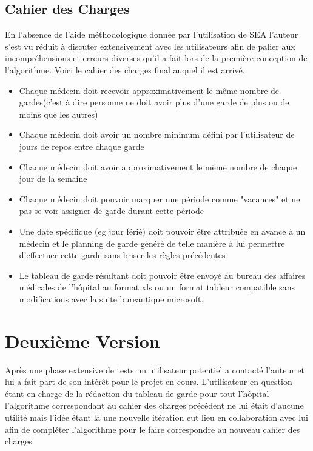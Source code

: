 \documentclass[11pt]{report}
\begin{document}
\subsection{Cahier des Charges}
En l'absence de l'aide méthodologique donnée par l'utilisation de SEA l'auteur s'est vu réduit à discuter extensivement avec les utilisateurs afin de palier aux incompréhensions et erreurs diverses qu'il a fait lors de la première conception de l'algorithme.
Voici le cahier des charges final auquel il est arrivé.
\begin{itemize}
\item Chaque médecin doit recevoir approximativement le même nombre de gardes(c'est à dire personne ne doit avoir plus d'une garde de plus ou de moins que les autres)
\item Chaque médecin doit avoir un nombre minimum défini par l'utilisateur de jours de repos entre chaque garde
\item Chaque médecin doit avoir approximativement le même nombre de chaque jour de la semaine
\item Chaque médecin doit pouvoir marquer une période comme "vacances" et ne pas se voir assigner de garde durant cette période
\item Une date spécifique (eg jour férié) doit pouvoir être attribuée en avance à un médecin et le planning de garde généré de telle manière à lui permettre d'effectuer cette garde sans briser les règles précédentes
\item Le tableau de garde résultant doit pouvoir être envoyé au bureau des affaires médicales de l'hôpital au format xls ou un format tableur compatible sans modifications avec la suite bureautique microsoft.
\end{itemize}

\section{Deuxième Version}
Après une phase extensive de tests un utilisateur potentiel a contacté l'auteur et lui a fait part de son intérêt pour le projet en cours.
L'utilisateur en question étant en charge de la rédaction du tableau de garde pour tout l'hôpital l'algorithme correspondant au cahier des charges précédent ne lui était d'aucune utilité mais l'idée étant là une nouvelle itération eut lieu en collaboration avec lui afin de compléter l'algorithme pour le faire correspondre au nouveau cahier des charges.
\end{document}
